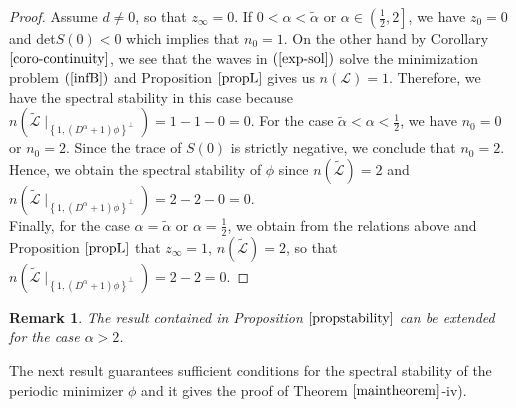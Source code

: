 \documentclass[12pt,reqno]{amsart}
\newcommand{\2}{L^2_{per}(0, T)}
\numberwithin{equation}{section}
\numberwithin{figure}{section}
\newtheorem{remark}[theorem]{Remark}
\begin{document}
\begin{proof}
Assume $d\neq0$, so that $z_{\infty} =0$. If $0<\alpha<\tilde{\alpha}$ or $\alpha\in\left(\frac{1}{2},2\right]$, we have $z_0=0$ and det$S(0) <0 $ which implies that $n_0=1$. On the other hand by Corollary $\ref{coro-continuity}$, we see that the waves in $(\ref{exp-sol})$ solve the minimization problem $(\ref{infB})$ and Proposition $\ref{propL}$ gives us $n(\mathcal{L})=1$. Therefore, we have the spectral stability in this case because $ n (\mathcal{\tilde{L}}\mid_{\left\{1, (D^{\alpha}+1)\phi\right\}^{\bot}}) =1-1-0=0$. For the case $\tilde{\alpha}<\alpha<\frac{1}{2}$, we have $n_0=0$ or $n_0=2$. Since the trace of  $S(0)$ is strictly negative, we conclude that $n_0=2$. Hence, we obtain the spectral stability of $\phi$ since $n(\tilde{\mathcal{L}})=2$ and $ n (\mathcal{\tilde{L}}\mid_{\left\{1, (D^{\alpha}+1)\phi\right\}^{\bot}})=2-2-0=0$.   \\
\indent Finally, for the case $\alpha=\tilde{\alpha}$ or $\alpha=\frac{1}{2}$, we obtain from the relations above and Proposition $\ref{propL}$ that $z_{\infty}=1$, $n(\mathcal{\tilde{L}})=2$, so that $n (\mathcal{\tilde{L}}\mid_{\left\{1, (D^{\alpha}+1)\phi\right\}^{\bot}})=2-2=0$.
\end{proof}



\begin{remark}
	The result contained in Proposition $\ref{propstability}$ can be extended for the case $\alpha>2$.
\end{remark}


\indent The next result guarantees sufficient conditions for the spectral stability of the periodic minimizer $\phi$ and it gives the proof of Theorem $\ref{maintheorem}$-iv).
\end{document}
